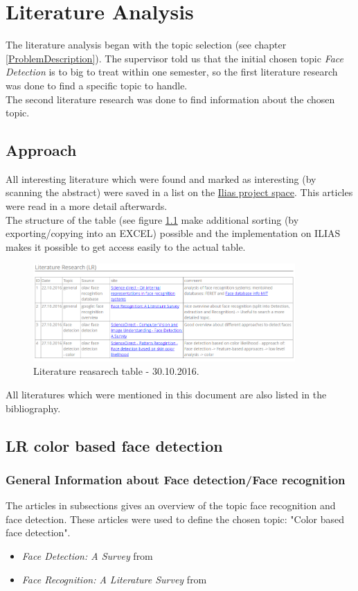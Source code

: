 \documentclass[Bachelorarbeit.tex]{subfiles}
\begin{document}
\chapter{Literature Analysis}
The literature analysis began with the topic selection (see chapter \ref{ProblemDescription}). The supervisor told us that the initial chosen topic \textit{Face Detection} is to big to treat within one semester, so the first literature research was done to find a specific topic to handle.\\
The second literature research was done to find information about the chosen topic.
\section{Approach}
All interesting literature which were found and marked as interesting (by scanning the abstract) were saved in a list on the \href{https://ilias.fhv.at/goto.php?target=wiki_298249_Literature_Research_%28LR%29}{Ilias project space}. This articles were read in a more detail afterwards.\\
The structure of the table (see figure \ref{LRT}  make additional sorting (by exporting/copying into an EXCEL) possible and the implementation on ILIAS makes it possible to get access easily to the actual table.

\begin{figure}[!h] %
\centering
\includegraphics[width=10cm]{./pictures/LR_20161030}
\caption{Literature reasarech table - 30.10.2016. \label{LRT}}
\end{figure}

All literatures which were mentioned in this document are also listed in the bibliography.

\section{LR color based face detection}
\subsection{General Information about Face detection/Face recognition}
The articles in subsections gives an overview of the topic face recognition and face detection. These articles were used to define the chosen topic: "Color based face detection".
\begin{itemize}
\item \textit{Face Detection: A Survey} from \cite{FDASurvey} 
\item \textit{Face Recognition: A Literature Survey} from \cite{FRLiteratureSurvey}    
\end{itemize}
\end{document}
